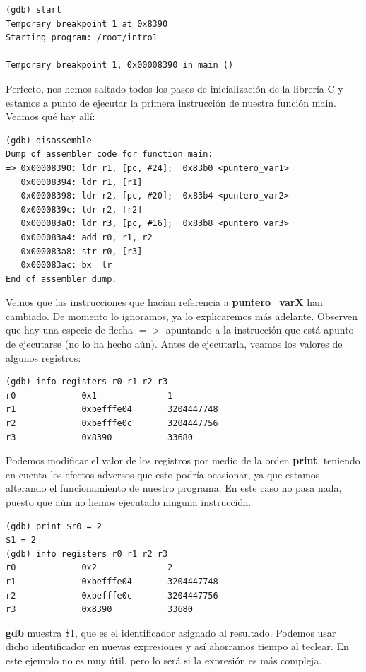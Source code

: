 \begin{lstlisting}
(gdb) start
Temporary breakpoint 1 at 0x8390
Starting program: /root/intro1
 
Temporary breakpoint 1, 0x00008390 in main ()
\end{lstlisting}

Perfecto, nos hemos saltado todos los pasos de inicialización de la
librería C y estamos a punto de ejecutar la primera instrucción de
nuestra función main. Veamos qué hay allí:

\begin{lstlisting}
(gdb) disassemble
Dump of assembler code for function main:
=> 0x00008390: ldr r1, [pc, #24];  0x83b0 <puntero_var1>
   0x00008394: ldr r1, [r1]
   0x00008398: ldr r2, [pc, #20];  0x83b4 <puntero_var2>
   0x0000839c: ldr r2, [r2]
   0x000083a0: ldr r3, [pc, #16];  0x83b8 <puntero_var3>
   0x000083a4: add r0, r1, r2
   0x000083a8: str r0, [r3]
   0x000083ac: bx  lr
End of assembler dump.
\end{lstlisting}

Vemos que las instrucciones que hacían referencia a {\bf puntero\_varX}
han cambiado. De momento lo ignoramos, ya lo explicaremos más adelante.
Observen que hay una especie de flecha {\bf $=>$} apuntando a la
instrucción que está apunto de ejecutarse (no lo ha hecho aún).
Antes de ejecutarla, veamos los valores de algunos registros:

\begin{lstlisting}
(gdb) info registers r0 r1 r2 r3
r0             0x1              1
r1             0xbefffe04       3204447748
r2             0xbefffe0c       3204447756
r3             0x8390           33680
\end{lstlisting}

Podemos modificar el valor de los registros por medio de la orden
{\bf print}, teniendo en cuenta los efectos adversos que esto podría
ocasionar, ya que estamos alterando el funcionamiento de nuestro
programa. En este caso no pasa nada, puesto que aún no hemos ejecutado
ninguna instrucción.

\begin{lstlisting}
(gdb) print $r0 = 2
$1 = 2
(gdb) info registers r0 r1 r2 r3
r0             0x2              2
r1             0xbefffe04       3204447748
r2             0xbefffe0c       3204447756
r3             0x8390           33680
\end{lstlisting}

{\bf gdb} muestra \$1, que es el identificador asignado al resultado. Podemos
usar dicho identificador en nuevas expresiones y así ahorramos tiempo al teclear.
En este ejemplo no es muy útil, pero lo será si la expresión es más compleja.

